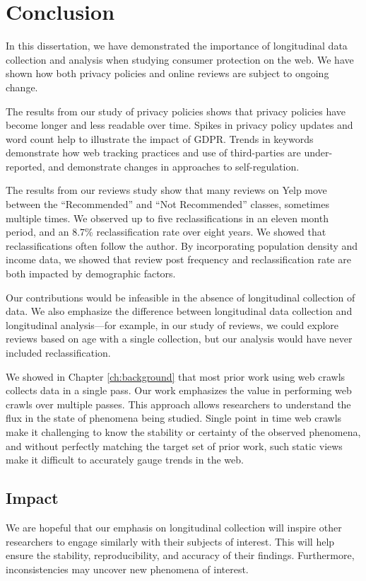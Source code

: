 \chapter{Conclusion} \label{ch:conclusion}

In this dissertation, we have demonstrated the importance of longitudinal data collection and analysis when studying consumer protection on the web. We have shown how both privacy policies and online reviews are subject to ongoing change.

The results from our study of privacy policies shows that privacy policies have become longer and less readable over time. Spikes in privacy policy updates and word count help to illustrate the impact of GDPR. Trends in keywords demonstrate how web tracking practices and use of third-parties are under-reported, and demonstrate changes in approaches to self-regulation.

The results from our reviews study show that many reviews on Yelp move between the ``Recommended'' and ``Not Recommended'' classes, sometimes multiple times. We observed up to five reclassifications in an eleven month period, and an 8.7\% reclassification rate over eight years. We showed that reclassifications often follow the author. By incorporating population density and income data, we showed that review post frequency and reclassification rate are both impacted by demographic factors.

Our contributions would be infeasible in the absence of longitudinal collection of data. We also emphasize the difference between longitudinal data collection and longitudinal analysis---for example, in our study of reviews, we could explore reviews based on age with a single collection, but our analysis would have never included reclassification.

We showed in Chapter \ref{ch:background} that most prior work using web crawls collects data in a single pass. Our work emphasizes the value in performing web crawls over multiple passes. This approach allows researchers to understand the flux in the state of phenomena being studied. Single point in time web crawls make it challenging to know the stability or certainty of the observed phenomena, and without perfectly matching the target set of prior work, such static views make it difficult to accurately gauge trends in the web.

\section{Impact}
We are hopeful that our emphasis on longitudinal collection will inspire other researchers to engage similarly with their subjects of interest. This will help ensure the stability, reproducibility, and accuracy of their findings. Furthermore, inconsistencies may uncover new phenomena of interest.

